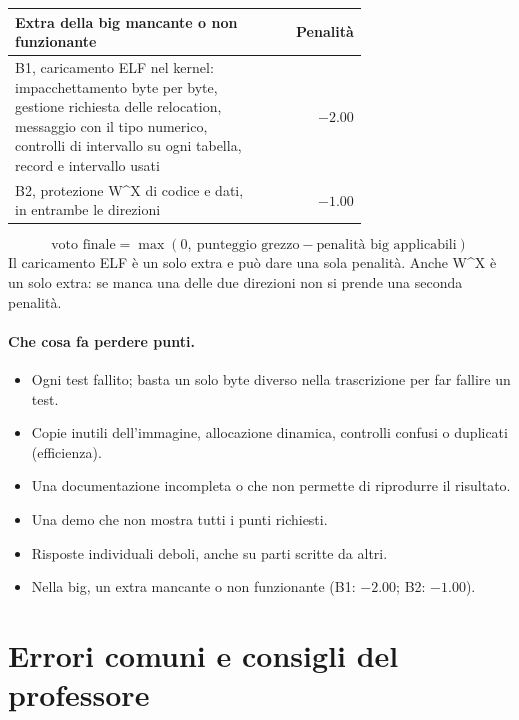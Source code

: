 \begin{center}
    \small
    \begin{tabular}{|p{0.7\linewidth}|r|}
    \hline
    \raggedright Extra della big mancante o non funzionante & Penalità \tabularnewline
    \hline\hline
    \raggedright B1, caricamento ELF nel kernel: impacchettamento byte per byte, gestione richiesta delle relocation, messaggio con il tipo numerico, controlli di intervallo su ogni tabella, record e intervallo usati & $-2.00$ \tabularnewline
    \hline
    \raggedright B2, protezione W\textasciicircum{}X di codice e dati, in entrambe le direzioni & $-1.00$ \tabularnewline
    \hline
    \end{tabular}
\end{center}

\[
\mbox{voto finale} = \max(0,\ \mbox{punteggio grezzo} - \mbox{penalità big applicabili})
\]
Il caricamento ELF è un solo extra e può dare una sola penalità. Anche W\textasciicircum{}X è un solo extra: se manca una delle due direzioni non si prende una seconda penalità.

\paragraph{Che cosa fa perdere punti.}
\begin{itemize}
\item Ogni test fallito; basta un solo byte diverso nella trascrizione per far fallire un test.
\item Copie inutili dell'immagine, allocazione dinamica, controlli confusi o duplicati (efficienza).
\item Una documentazione incompleta o che non permette di riprodurre il risultato.
\item Una demo che non mostra tutti i punti richiesti.
\item Risposte individuali deboli, anche su parti scritte da altri.
\item Nella big, un extra mancante o non funzionante (B1: $-2.00$; B2: $-1.00$).
\end{itemize}

\section{Errori comuni e consigli del professore}

